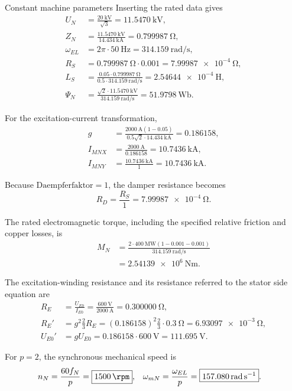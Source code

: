 \begin{formulaBox}{Constant machine parameters}
	Inserting the rated data gives
	\begin{align}
		U_N
		&=\frac{\SI{20}{\kilo\volt}}{\sqrt{3}}
		=\boxed{\SI{11.5470}{\kilo\volt}},\\
		Z_N
		&=\frac{\SI{11.5470}{\kilo\volt}}
		{\SI{14.434}{\kilo\ampere}}
		=\boxed{\SI{0.799987}{\ohm}},\\
		\omega_{EL}
		&=2\pi\cdot\SI{50}{\hertz}
		=\boxed{\SI{314.159}{\radian\per\second}},\\
		R_S
		&=\SI{0.799987}{\ohm}\cdot0.001
		=\boxed{\SI{7.99987e-4}{\ohm}},\\
		L_S
		&=\frac{0.05\cdot\SI{0.799987}{\ohm}}
		{0.5\cdot\SI{314.159}{\radian\per\second}}
		=\boxed{\SI{2.54644e-4}{\henry}},\\
		\Psi_N
		&=\frac{\sqrt{2}\cdot\SI{11.5470}{\kilo\volt}}
		{\SI{314.159}{\radian\per\second}}
		=\boxed{\SI{51.9798}{\weber}}.
	\end{align}
	
	For the excitation-current transformation,
	\begin{align}
		g
		&=\frac{\SI{2000}{\ampere}(1-0.05)}
		{0.5\sqrt{2}\cdot\SI{14.434}{\kilo\ampere}}
		=\boxed{0.186158},\\
		I_{MNX}
		&=\frac{\SI{2000}{\ampere}}{0.186158}
		=\boxed{\SI{10.7436}{\kilo\ampere}},\\
		I_{MNY}
		&=\frac{\SI{10.7436}{\kilo\ampere}}{1}
		=\boxed{\SI{10.7436}{\kilo\ampere}}.
	\end{align}
	
	Because \(\mathrm{Daempferfaktor}=1\), the damper resistance becomes
	\begin{equation}
		R_D=\frac{R_S}{1}
		=\boxed{\SI{7.99987e-4}{\ohm}}.
	\end{equation}
	
	The rated electromagnetic torque, including the specified relative friction
	and copper losses, is
	\begin{align}
		M_N
		&=\frac{2\cdot\SI{400}{\mega\watt}
			(1-0.001-0.001)}
		{\SI{314.159}{\radian\per\second}}\\
		&=\boxed{\SI{2.54139e6}{\newton\metre}}.
	\end{align}
	
	The excitation-winding resistance and its resistance referred to the stator side
	equation are
	\begin{align}
		R_E
		&=\frac{U_{E0}}{I_{E0}}
		=\frac{\SI{600}{\volt}}{\SI{2000}{\ampere}}
		=\boxed{\SI{0.300000}{\ohm}},\\
		R_E'
		&=g^2\frac{2}{3}R_E
		=(0.186158)^2\frac{2}{3}\cdot\SI{0.3}{\ohm}
		=\boxed{\SI{6.93097e-3}{\ohm}},\\
		U_{E0}'
		&=gU_{E0}
		=0.186158\cdot\SI{600}{\volt}
		=\boxed{\SI{111.695}{\volt}}.
	\end{align}
	
	For \(p=2\), the synchronous mechanical speed is
	\begin{align}
		n_N&=\frac{60f_N}{p}
		=\boxed{\SI{1500}{\rpm}}, &
		\omega_{mN}&=\frac{\omega_{EL}}{p}
		=\boxed{\SI{157.080}{\radian\per\second}}.
	\end{align}
	
\end{formulaBox}

